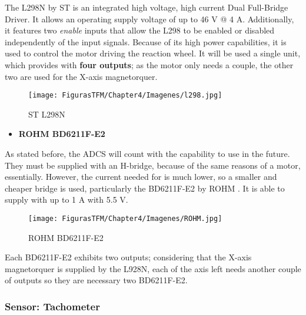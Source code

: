 The L298N by ST \cite{l298n} is an integrated high voltage, high current Dual Full-Bridge Driver. It allows an operating supply voltage of up to 46 V @ 4 A. Additionally, it features two \textit{enable} inputs that allow the L298 to be enabled or disabled independently of the input signals. Because of its high power capabilities, it is used to control the motor driving the reaction wheel. It will be used a single unit, which provides with \textbf{four outputs}; as the motor only needs a couple, the other two are used for the X-axis magnetorquer.


		\begin{figure} [H]
			\centering
			\texttt{[image: FigurasTFM/Chapter4/Imagenes/l298.jpg]}
			\caption{ST L298N \cite{l298n}}  %
			\vspace{-1cm}
\end{figure}
\newpage



\begin{itemize} [noitemsep,topsep=0pt]
\item \textbf{ROHM BD6211F-E2}
\end{itemize}

As stated before, the \acrshort{ADCS} will count with the capability to use  in the future. They must be supplied with an H-bridge, because of the same reasons of a motor, essentially. However, the current needed for  is much lower, so a smaller and cheaper bridge is used, particularly the BD6211F-E2 by ROHM \cite{rohm}. It is able to supply with up to 1 A with 5.5 V. 

		\begin{figure} [H]
			\centering
			\texttt{[image: FigurasTFM/Chapter4/Imagenes/ROHM.jpg]}
			\caption{ROHM BD6211F-E2 \cite{rohm}}  %
\end{figure}

Each BD6211F-E2 exhibits two outputs; considering that the X-axis magnetorquer is supplied by the L928N, each of the axis left needs another couple of outputs so they are necessary two BD6211F-E2. 



\subsubsection{Sensor: Tachometer}

